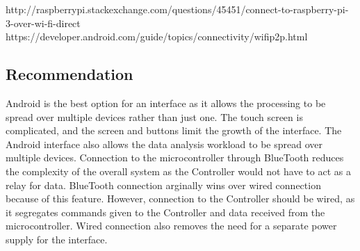 \documentclass[draftclsnofoot,onecolumn,letterpaper,10pt]{IEEEtran}
\begin{document}
http://raspberrypi.stackexchange.com/questions/45451/connect-to-raspberry-pi-3-over-wi-fi-direct
https://developer.android.com/guide/topics/connectivity/wifip2p.html

\subsection{Recommendation}
Android is the best option for an interface as it allows the processing to be spread over multiple devices rather than just one.
The touch screen is complicated, and the screen and buttons limit the growth of the interface.
The Android interface also allows the data analysis workload to be spread over multiple devices.
Connection to the microcontroller through BlueTooth reduces the complexity of the overall system as the Controller would not have to act as a relay for data.
BlueTooth connection arginally wins over wired connection because of this feature.
However, connection to the Controller should be wired, as it segregates commands given to the Controller and data received from the microcontroller.
Wired connection also removes the need for a separate power supply for the interface.



\end{document}
